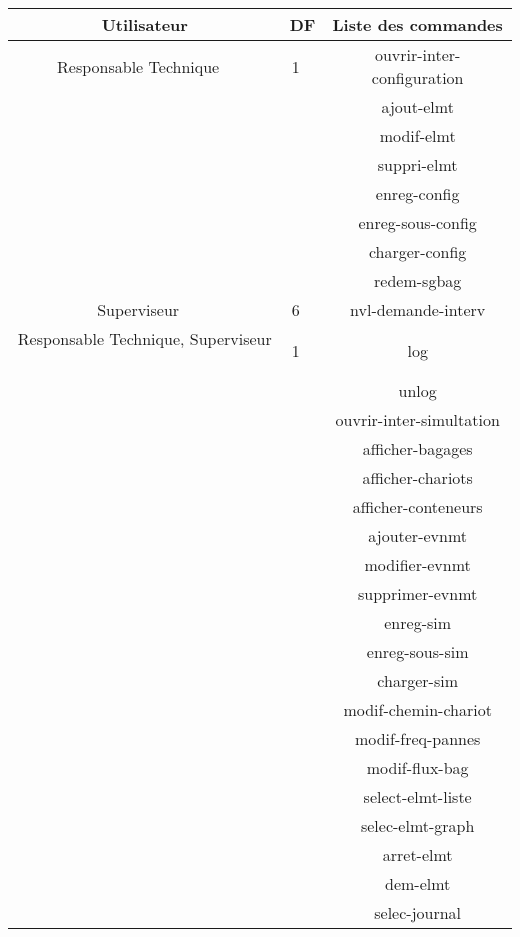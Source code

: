 \begin{center}
\begin{tabular}{|c|c|c|}
	 \hline \textbf{Utilisateur} & \textbf{DF} & \textbf{Liste des commandes} \\
\hline
	Responsable Technique ~&  1 ~& ouvrir-inter-configuration \\ 
	 ~&   ~& ajout-elmt \\ 
	 ~&   ~& modif-elmt \\ 
	 ~&   ~& suppri-elmt \\ 
	 ~&   ~& enreg-config \\ 
	 ~&   ~& enreg-sous-config \\ 
	 ~&   ~& charger-config \\ 
	 ~&   ~& redem-sgbag \\ 
\hline
	Superviseur ~&  6 ~& nvl-demande-interv \\ 
\hline
	Responsable Technique, Superviseur ~&  1 ~& log \\ 
	 ~&   ~& unlog \\ 
	 ~&   ~& ouvrir-inter-simultation \\ 
	 ~&   ~& afficher-bagages \\ 
	 ~&   ~& afficher-chariots \\ 
	 ~&   ~& afficher-conteneurs \\ 
	 ~&   ~& ajouter-evnmt \\ 
	 ~&   ~& modifier-evnmt \\ 
	 ~&   ~& supprimer-evnmt \\ 
	 ~&   ~& enreg-sim \\ 
	 ~&   ~& enreg-sous-sim \\ 
	 ~&   ~& charger-sim \\ 
	 ~&   ~& modif-chemin-chariot \\ 
	 ~&   ~& modif-freq-pannes \\ 
	 ~&   ~& modif-flux-bag \\ 
	 ~&   ~& select-elmt-liste \\ 
	 ~&   ~& selec-elmt-graph \\ 
	 ~&   ~& arret-elmt \\ 
	 ~&   ~& dem-elmt \\ 
	 ~&   ~& selec-journal \\ 
\hline
\end{tabular}
\end{center}
